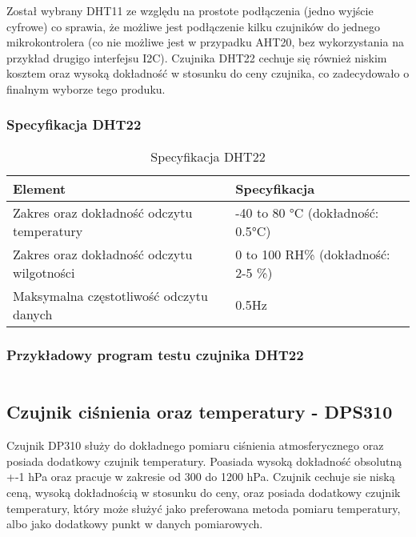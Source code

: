 \documentclass[12pt,a4paper]{article}
\begin{document}
Został wybrany DHT11 ze względu na prostote podłączenia (jedno wyjście cyfrowe) co sprawia, że możliwe jest podłączenie
kilku czujników do jednego mikrokontrolera (co nie możliwe jest w przypadku AHT20, bez wykorzystania na przykład drugigo interfejsu I2C).
Czujnika DHT22 cechuje się również niskim kosztem oraz wysoką dokładność w stosunku do ceny czujnika, co zadecydowało o finalnym wyborze tego produku. 

\subsubsection{Specyfikacja DHT22}

\begin{table}[H]
    \centering
    \begin{tabular}{|l|l|}
        \hline
        Element & Specyfikacja \\
        \hline
        Zakres oraz dokładność odczytu temperatury & -40 to 80 °C (dokładność: 0.5°C) \\
        \hline
        Zakres oraz dokładność odczytu wilgotności & 0 to 100 RH\% (dokładność: 2-5 \%) \\
        \hline
        Maksymalna częstotliwość odczytu danych & 0.5Hz \\
        \hline
    \end{tabular}
    \caption{Specyfikacja DHT22}
    \label{dht22-spec}
\end{table}

\subsubsection{Przykładowy program testu czujnika DHT22}

\begin{code}[H]
\inputminted[frame=lines,]{c}{../proj/dht22-test/dht22-test.ino}

\caption{Test czujnika DHT22}
\end{code}

\subsection{Czujnik ciśnienia oraz temperatury - DPS310}

Czujnik DP310 służy do dokładnego pomiaru ciśnienia atmosferycznego oraz posiada dodatkowy czujnik temperatury. Poasiada wysoką dokładność obsolutną +-1 hPa oraz 
pracuje w zakresie od 300 do 1200 hPa. Czujnik cechuje sie niską ceną, wysoką dokładnością w stosunku do ceny, oraz posiada dodatkowy czujnik temperatury, który może 
służyć jako preferowana metoda pomiaru temperatury, albo jako dodatkowy punkt w danych pomiarowych.
\end{document}
